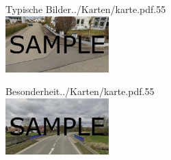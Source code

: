 \documentclass[11pt, dvipsnames,aspectratio=169]{beamer}
\begin{document}
\begin{mapframe}{Typische Bilder}{../Karten/karte.pdf}{.55\textwidth}
	\centering
	 \\[.3cm]
	\includegraphics[width=4cm]{../Bilder/wohnsiedlung.png} \\
	\scriptsize \bildzwei
\end{mapframe}

\begin{mapframe}{Besonderheit}{../Karten/karte.pdf}{.55\textwidth}
	\centering
	 \\[.3cm]
	\includegraphics[width=4cm]{../Bilder/besonderheit.png} \\
	\scriptsize \bilddrei
\end{mapframe}
\end{document}
